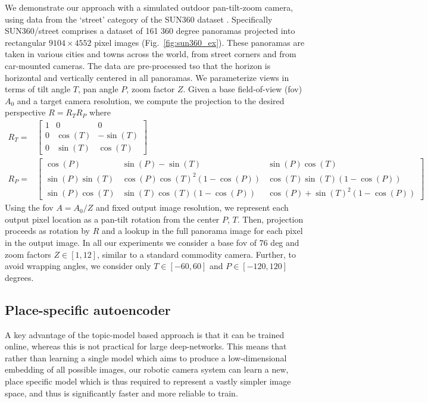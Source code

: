 We demonstrate our approach with a simulated outdoor pan-tilt-zoom camera, using data from the `street' category of the SUN360 dataset \citep{SUN360}. Specifically SUN360/street comprises a dataset of 161 360 degree panoramas projected into rectangular $9104 \times 4552$ pixel images (Fig.~\ref{fig:sun360_ex}). These panoramas are taken in various cities and towns across the world, from street corners and from car-mounted cameras. The data are pre-processed tso that the horizon is horizontal and vertically centered in all panoramas. We parameterize views in terms of tilt angle $T$, pan angle $P$, zoom factor $Z$. Given a base field-of-view (fov) $A_0$ and a target camera resolution, we compute the projection to the desired perspective $R = R_TR_P$ where
\begin{equation}
\begin{split}
R_T =& 
\begin{bmatrix}
1 & 0 & 0\\
0 & \cos(T) & -\sin(T)\\
0 & \sin(T) & \cos(T)
\end{bmatrix}\\
R_P =&  
\begin{bmatrix}
\cos(P)        & \sin(P) - \sin(T)            & \sin(P)\cos(T)\\
\sin(P)\sin(T) & \cos(P)\cos(T)^2(1 -\cos(P)) & \cos(T)\sin(T)(1-\cos(P))\\
\sin(P)\cos(T) & \sin(T)\cos(T)(1-\cos(P))    & \cos(P)+\sin(T)^2(1-\cos(P))
\end{bmatrix}
\end{split}
\end{equation}
Using the fov $A = A_0/Z$ and fixed output image resolution, we represent each output pixel location as a pan-tilt rotation from the center $P$, $T$. Then, projection proceeds as rotation by $R$ and a lookup in the full panorama image for each pixel in the output image. In all our experiments we consider a base fov of 76 deg and zoom factors $Z \in [1, 12]$, similar to a standard commodity camera. Further, to avoid wrapping angles, we consider only $T \in [-60, 60]$ and $P \in [-120, 120]$ degrees.

\subsection{Place-specific autoencoder}
A key advantage of the topic-model based approach is that it can be trained online, whereas this is not practical for large deep-networks. This means that rather than learning a single model which aims to produce a low-dimensional embedding of all possible images, our robotic camera system can learn a new, place specific model which is thus required to represent a vastly simpler image space, and thus is significantly faster and more reliable to train.

